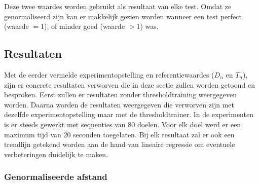 \documentclass{article}
\begin{document}
Deze twee waardes worden gebruikt als resultaat van elke test. Omdat ze genormaliseerd zijn kan er makkelijk gezien worden wanneer een test perfect (waarde $= 1$), of minder goed (waarde $> 1$) was.

\subsection{Resultaten}
Met de eerder vermelde experimentopstelling en referentiewaardes ($D_n$ en $T_n$), zijn er concrete resultaten verworven die in deze sectie zullen worden getoond en besproken. Eerst zullen er resultaten zonder thresholdtraining weergegeven worden. Daarna worden de resultaten weergegeven die verworven zijn met dezelfde experimentopstelling maar met de thresholdtrainer. In de experimenten is er steeds gewerkt met sequenties van 80 doelen. Voor elk doel werd er een maximum tijd van 20 seconden toegelaten. Bij elk resultaat zal er ook een trendlijn getekend worden aan de hand van lineaire regressie om eventuele verbeteringen duidelijk te maken. 
\subsubsection*{Genormaliseerde afstand}
\end{document}
